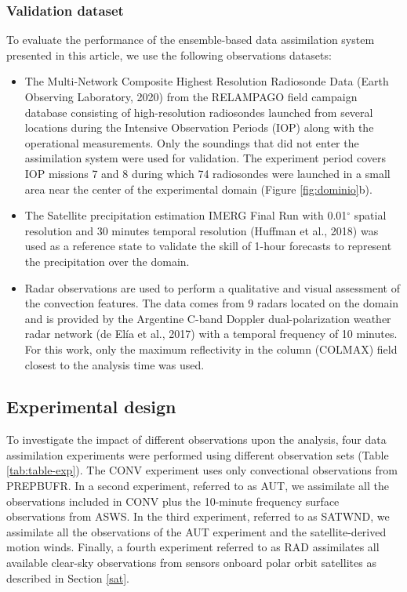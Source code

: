 \documentclass[final,5p,times,twocolumn,authoryear]{elsarticle} %
\begin{document}
\hypertarget{validation-dataset}{%
\subsubsection{Validation dataset}\label{validation-dataset}}

To evaluate the performance of the ensemble-based data assimilation system presented in this article, we use the following observations datasets:

\begin{itemize}
\item
  The Multi-Network Composite Highest Resolution Radiosonde Data (Earth Observing Laboratory, 2020) from the RELAMPAGO field campaign database consisting of high-resolution radiosondes launched from several locations during the Intensive Observation Periods (IOP) along with the operational measurements. Only the soundings that did not enter the assimilation system were used for validation. The experiment period covers IOP missions 7 and 8 during which 74 radiosondes were launched in a small area near the center of the experimental domain (Figure \ref{fig:dominio}b).
\item
  The Satellite precipitation estimation IMERG Final Run with 0.01\(^{\circ}\) spatial resolution and 30 minutes temporal resolution (Huffman et al., 2018) was used as a reference state to validate the skill of 1-hour forecasts to represent the precipitation over the domain.
\item
  Radar observations are used to perform a qualitative and visual assessment of the convection features. The data comes from 9 radars located on the domain and is provided by the Argentine C-band Doppler dual-polarization weather radar network (de Elía et al., 2017) with a temporal frequency of 10 minutes. For this work, only the maximum reflectivity in the column (COLMAX) field closest to the analysis time was used.
\end{itemize}

\hypertarget{experimental-design}{%
\subsection{Experimental design}\label{experimental-design}}

To investigate the impact of different observations upon the analysis, four data assimilation experiments were performed using different observation sets (Table \ref{tab:table-exp}). The CONV experiment uses only convectional observations from PREPBUFR. In a second experiment, referred to as AUT, we assimilate all the observations included in CONV plus the 10-minute frequency surface observations from ASWS. In the third experiment, referred to as SATWND, we assimilate all the observations of the AUT experiment and the satellite-derived motion winds. Finally, a fourth experiment referred to as RAD assimilates all available clear-sky observations from sensors onboard polar orbit satellites as described in Section \ref{sat}.
\end{document}
